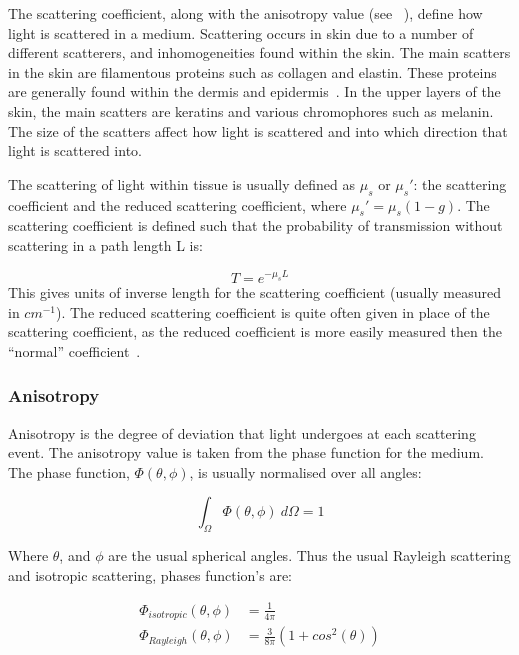 The scattering coefficient, along with the anisotropy value (see ~), define how light is scattered in a medium. Scattering occurs in skin due to a number of different scatterers, and inhomogeneities found within the skin. The main scatters in the skin are filamentous proteins such as collagen and elastin. These proteins are generally found within the dermis and epidermis~\cite{jacques1996origins}. In the upper layers of the skin, the main scatters are keratins and various chromophores such as melanin. 
The size of the scatters affect how light is scattered and into which direction that light is scattered into.

\medskip

The scattering of light within tissue is usually defined as $\mu_s$ or $\mu_s'$: the scattering coefficient and the reduced scattering coefficient, where $\mu_s'=\mu_s(1-g)$. The scattering coefficient is defined such that the probability of transmission without scattering in a path length L is:

\begin{equation}
	T=e^{-\mu_sL}
\end{equation}
This gives units of inverse length for the scattering coefficient (usually measured in $cm^{-1}$). The reduced scattering coefficient is quite often given in place of the scattering coefficient, as the reduced coefficient is more easily measured then the ``normal'' coefficient~\cite{jacques2013optical}.



\subsubsection*{Anisotropy}\label{sec:ansio}

Anisotropy is the degree of deviation that light undergoes at each scattering event. The anisotropy value is taken from the phase function for the medium. The phase function, $\Phi(\theta,\phi)$, is usually normalised over all angles:

\begin{equation}
	\int_{\Omega}\Phi(\theta,\phi)\ d\Omega = 1
\end{equation}

Where $\theta$, and $\phi$ are the usual spherical angles.
Thus the usual Rayleigh scattering and isotropic scattering, phases function's are:

\begin{align}
	\Phi_{isotropic}(\theta,\phi)&=\frac{1}{4\pi}\\
	\Phi_{Rayleigh}(\theta,\phi)&=\frac{3}{8\pi}(1+cos^2(\theta))
\end{align}

